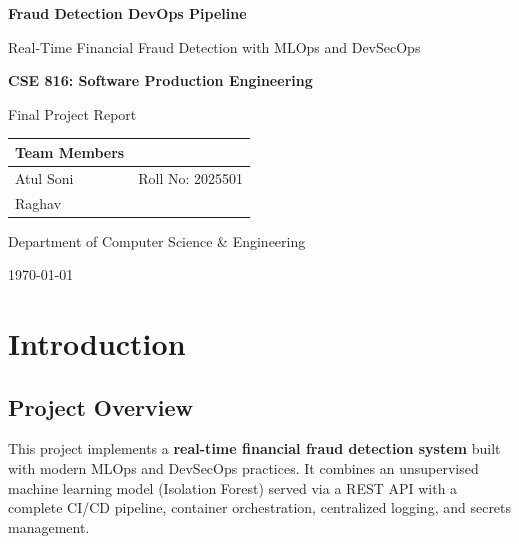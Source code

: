 \documentclass[12pt,a4paper]{article}
\begin{document}
\begin{titlepage}
    \centering
    \vspace*{1cm}

    {\Huge\bfseries\color{iitkblue} Fraud Detection DevOps Pipeline\par}
    \vspace{0.5cm}
    {\Large Real-Time Financial Fraud Detection with MLOps and DevSecOps\par}

    \vspace{2cm}

    {\large\textbf{CSE 816: Software Production Engineering}\par}
    {\large Final Project Report\par}

    \vspace{2cm}

    \begin{tabular}{ll}
        \toprule
        \textbf{Team Members} & \\
        \midrule
        Atul Soni & Roll No: 2025501 \\
        Raghav & \\
        \bottomrule
    \end{tabular}

    \vspace{3cm}

    {\large Department of Computer Science \& Engineering\par}

    \vspace{1cm}

    {\large\today\par}

    \vfill
\end{titlepage}

\tableofcontents
\newpage

\section{Introduction}

\subsection{Project Overview}

This project implements a \textbf{real-time financial fraud detection system} built with modern MLOps and DevSecOps practices. It combines an unsupervised machine learning model (Isolation Forest) served via a REST API with a complete CI/CD pipeline, container orchestration, centralized logging, and secrets management.
\end{document}
